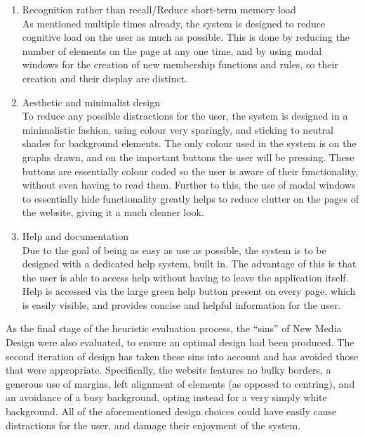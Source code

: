 \begin{enumerate}
\item Recognition rather than recall/Reduce short-term memory load\\
As mentioned multiple times already, the system is designed to reduce cognitive load on the user as much as possible. This is done by reducing the number of elements on the page at any one time, and by using modal windows for the creation of new membership functions and rules, so their creation and their display are distinct.
\item Aesthetic and minimalist design\\
To reduce any possible distractions for the user, the system is designed in a minimalistic fashion, using colour very sparingly, and sticking to neutral shades for background elements. The only colour used in the system is on the graphs drawn, and on the important buttons the user will be pressing. These buttons are essentially colour coded so the user is aware of their functionality, without even having to read them. Further to this, the use of modal windows to essentially hide functionality greatly helps to reduce clutter on the pages of the website, giving it a much cleaner look.
\item Help and documentation\\
Due to the goal of being as easy as use as possible, the system is to be designed with a dedicated help system, built in. The advantage of this is that the user is able to access help without having to leave the application itself. Help is accessed via the large green help button present on every page, which is easily visible, and provides concise and helpful information for the user.
\end{enumerate}
\noindent 
As the final stage of the heuristic evaluation process, the ``sins'' of New Media Design \cite{golombisky2013white} were also evaluated, to ensure an optimal design had been produced. The second iteration of design has taken these sins into account and has avoided those that were appropriate. Specifically, the website features no bulky borders, a generous use of margins, left alignment of elements (as opposed to centring), and an avoidance of a busy background, opting instead for a very simply white background. All of the aforementioned design choices could have easily cause distractions for the user, and damage their enjoyment of the system.

